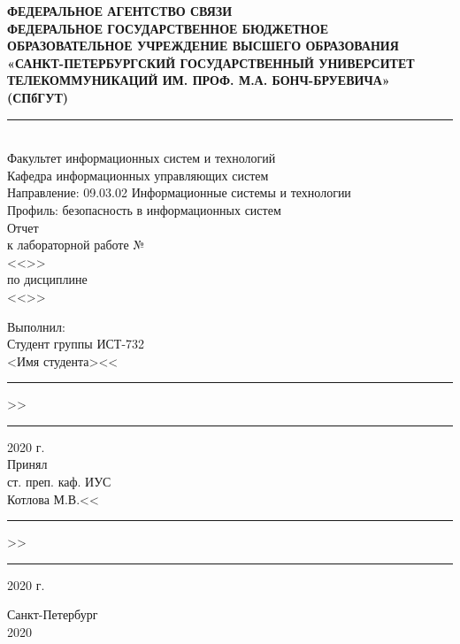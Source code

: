 \thispagestyle{empty}

\begin{center}
\small
\textbf{ФЕДЕРАЛЬНОЕ АГЕНТСТВО СВЯЗИ\\ \vspace{0.5em}
ФЕДЕРАЛЬНОЕ ГОСУДАРСТВЕННОЕ БЮДЖЕТНОЕ ОБРАЗОВАТЕЛЬНОЕ УЧРЕЖДЕНИЕ ВЫСШЕГО ОБРАЗОВАНИЯ\\
«САНКТ-ПЕТЕРБУРГСКИЙ ГОСУДАРСТВЕННЫЙ УНИВЕРСИТЕТ ТЕЛЕКОММУНИКАЦИЙ ИМ. ПРОФ. М.А. БОНЧ-БРУЕВИЧА»\\
(СПбГУТ)\\}
\normalsize
\rule{\linewidth}{1pt}\\
\vspace{1em}
Факультет информационных систем и технологий\\
Кафедра информационных управляющих систем\\
\vspace{2em}
Направление: 09.03.02 Информационные системы и технологии\\
Профиль: безопасность в информационных систем\\
\vspace{4em}
Отчет\\к лабораторной работе №\\
<<>>\\
по дисциплине\\
<<>>
\end{center}
\vspace{2em}
Выполнил:\\
Студент группы ИСТ-732\\
<Имя студента>\hfill<<\rule{2em}{0.5pt}>>\rule{4em}{0.5pt} 2020 г.\hspace*{3.5cm}
\vspace{1em}\\
Принял\\
ст. преп. каф. ИУС\\
Котлова М.В.\hfill<<\rule{2em}{0.5pt}>>\rule{4em}{0.5pt} 2020 г.\hspace*{3.5cm}
\vfill

\begin{center}
    Санкт-Петербург\\2020
\end{center}

\clearpage
